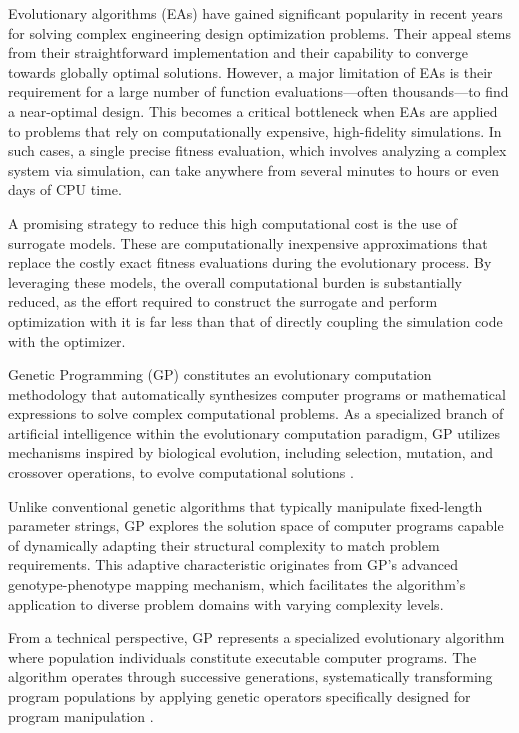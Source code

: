 \documentclass[12pt,a4paper]{report}
\begin{document}
Evolutionary algorithms (EAs) have gained significant popularity in recent years for solving complex engineering design optimization problems. Their appeal stems from their straightforward implementation and their capability to converge towards globally optimal solutions. However, a major limitation of EAs is their requirement for a large number of function evaluations—often thousands—to find a near-optimal design. This becomes a critical bottleneck when EAs are applied to problems that rely on computationally expensive, high-fidelity simulations. In such cases, a single precise fitness evaluation, which involves analyzing a complex system via simulation, can take anywhere from several minutes to hours or even days of CPU time.

A promising strategy to reduce this high computational cost is the use of surrogate models. These are computationally inexpensive approximations that replace the costly exact fitness evaluations during the evolutionary process. By leveraging these models, the overall computational burden is substantially reduced, as the effort required to construct the surrogate and perform optimization with it is far less than that of directly coupling the simulation code with the optimizer.

Genetic Programming (GP) constitutes an evolutionary computation methodology that automatically synthesizes computer programs or mathematical expressions to solve complex computational problems. As a specialized branch of artificial intelligence within the evolutionary computation paradigm, GP utilizes mechanisms inspired by biological evolution, including selection, mutation, and crossover operations, to evolve computational solutions \cite{bakurov2024, langdon2008}.

Unlike conventional genetic algorithms that typically manipulate fixed-length parameter strings, GP explores the solution space of computer programs capable of dynamically adapting their structural complexity to match problem requirements. This adaptive characteristic originates from GP's advanced genotype-phenotype mapping mechanism, which facilitates the algorithm's application to diverse problem domains with varying complexity levels.

From a technical perspective, GP represents a specialized evolutionary algorithm where population individuals constitute executable computer programs. The algorithm operates through successive generations, systematically transforming program populations by applying genetic operators specifically designed for program manipulation \cite{langdon2008}.
\end{document}

